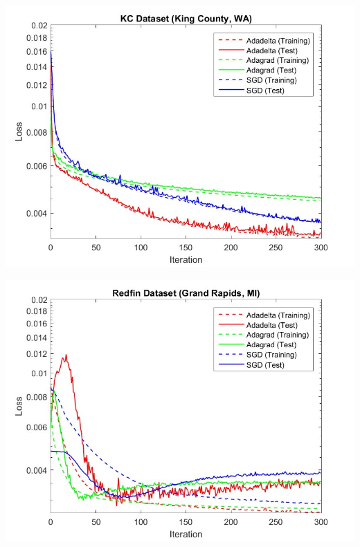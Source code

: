 \documentclass[10pt]{article}
\begin{document}
\begin{multicols}{2}
		\begin{center}
			\captionsetup{type=figure}
			\includegraphics[scale=0.27]{NeuralNet/fig_nn_04} \\
			\label{fig:fig_nn_result3}
		\end{center}
	
		\begin{center}
            \captionsetup{type=figure}
			\includegraphics[scale=0.27]{NeuralNet/fig_nn_03} \\
			\label{fig:fig_nn_result2}
		\end{center}
	

\end{multicols}
\end{document}
